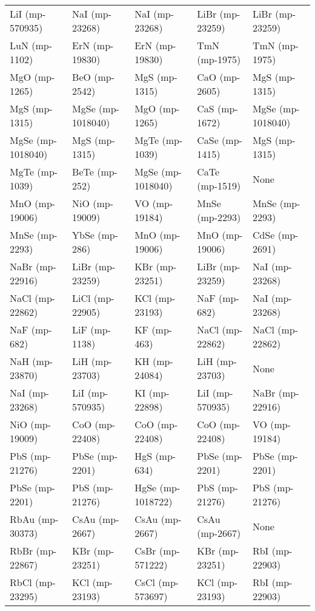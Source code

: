 \begin{longtable}{lllll}
  LiI (mp-570935) &    NaI (mp-23268) &    NaI (mp-23268) &   LiBr (mp-23259) &   LiBr (mp-23259) \\
    LuN (mp-1102) &    ErN (mp-19830) &    ErN (mp-19830) &     TmN (mp-1975) &     TmN (mp-1975) \\
    MgO (mp-1265) &     BeO (mp-2542) &     MgS (mp-1315) &     CaO (mp-2605) &     MgS (mp-1315) \\
    MgS (mp-1315) & MgSe (mp-1018040) &     MgO (mp-1265) &     CaS (mp-1672) & MgSe (mp-1018040) \\
MgSe (mp-1018040) &     MgS (mp-1315) &    MgTe (mp-1039) &    CaSe (mp-1415) &     MgS (mp-1315) \\
   MgTe (mp-1039) &     BeTe (mp-252) & MgSe (mp-1018040) &    CaTe (mp-1519) &              None \\
   MnO (mp-19006) &    NiO (mp-19009) &     VO (mp-19184) &    MnSe (mp-2293) &    MnSe (mp-2293) \\
   MnSe (mp-2293) &     YbSe (mp-286) &    MnO (mp-19006) &    MnO (mp-19006) &    CdSe (mp-2691) \\
  NaBr (mp-22916) &   LiBr (mp-23259) &    KBr (mp-23251) &   LiBr (mp-23259) &    NaI (mp-23268) \\
  NaCl (mp-22862) &   LiCl (mp-22905) &    KCl (mp-23193) &      NaF (mp-682) &    NaI (mp-23268) \\
     NaF (mp-682) &     LiF (mp-1138) &       KF (mp-463) &   NaCl (mp-22862) &   NaCl (mp-22862) \\
   NaH (mp-23870) &    LiH (mp-23703) &     KH (mp-24084) &    LiH (mp-23703) &              None \\
   NaI (mp-23268) &   LiI (mp-570935) &     KI (mp-22898) &   LiI (mp-570935) &   NaBr (mp-22916) \\
   NiO (mp-19009) &    CoO (mp-22408) &    CoO (mp-22408) &    CoO (mp-22408) &     VO (mp-19184) \\
   PbS (mp-21276) &    PbSe (mp-2201) &      HgS (mp-634) &    PbSe (mp-2201) &    PbSe (mp-2201) \\
   PbSe (mp-2201) &    PbS (mp-21276) & HgSe (mp-1018722) &    PbS (mp-21276) &    PbS (mp-21276) \\
  RbAu (mp-30373) &    CsAu (mp-2667) &    CsAu (mp-2667) &    CsAu (mp-2667) &              None \\
  RbBr (mp-22867) &    KBr (mp-23251) &  CsBr (mp-571222) &    KBr (mp-23251) &    RbI (mp-22903) \\
  RbCl (mp-23295) &    KCl (mp-23193) &  CsCl (mp-573697) &    KCl (mp-23193) &    RbI (mp-22903) \\

\end{longtable}
